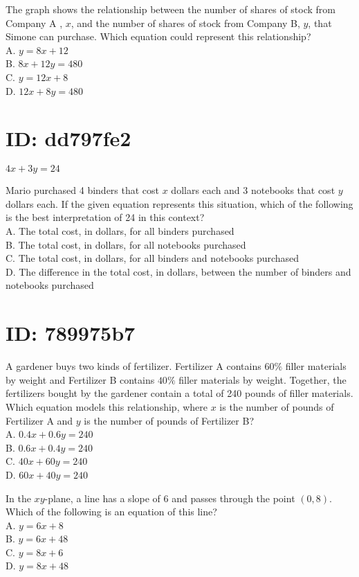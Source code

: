 The graph shows the relationship between the number of shares of stock from Company A , $x$, and the number of shares of stock from Company B, $y$, that Simone can purchase. Which equation could represent this relationship?\\
A. $y=8 x+12$\\
B. $8 x+12 y=480$\\
C. $y=12 x+8$\\
D. $12 x+8 y=480$

\section*{ID: dd797fe2}
$4 x+3 y=24$

Mario purchased 4 binders that cost $x$ dollars each and 3 notebooks that cost $y$ dollars each. If the given equation represents this situation, which of the following is the best interpretation of 24 in this context?\\
A. The total cost, in dollars, for all binders purchased\\
B. The total cost, in dollars, for all notebooks purchased\\
C. The total cost, in dollars, for all binders and notebooks purchased\\
D. The difference in the total cost, in dollars, between the number of binders and notebooks purchased

\section*{ID: 789975b7}
A gardener buys two kinds of fertilizer. Fertilizer A contains $60 \%$ filler materials by weight and Fertilizer B contains $40 \%$ filler materials by weight. Together, the fertilizers bought by the gardener contain a total of 240 pounds of filler materials. Which equation models this relationship, where $x$ is the number of pounds of Fertilizer A and $y$ is the number of pounds of Fertilizer B?\\
A. $0.4 x+0.6 y=240$\\
B. $0.6 x+0.4 y=240$\\
C. $40 x+60 y=240$\\
D. $60 x+40 y=240$

In the $x y$-plane, a line has a slope of 6 and passes through the point $(0,8)$. Which of the following is an equation of this line?\\
A. $y=6 x+8$\\
B. $y=6 x+48$\\
C. $y=8 x+6$\\
D. $y=8 x+48$

